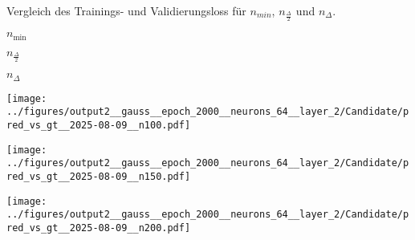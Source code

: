\begin{otherlanguage}{ngerman}
\begin{samepage}
\begin{minipage}{\textwidth}
\caption{Vergleich des Trainings- und Validierungsloss für $n_{min}$, $n_{\frac{\Delta}{2}}$ und $n_{\Delta}$.}
\label{fig:matrix_plot}

\begin{minipage}{0.05\textwidth}\vspace{0.5cm}\end{minipage}%
\begin{minipage}{0.3\textwidth}\centering \textbf{$n_{\mathrm{min}}$}\end{minipage}%
\begin{minipage}{0.3\textwidth}\centering \textbf{$n_{\frac{\Delta}{2}}$}\end{minipage}%
\begin{minipage}{0.3\textwidth}\centering \textbf{$n_{\Delta}$}\end{minipage}

\vspace{0.125cm}

\begin{minipage}{0.05\textwidth}
    \centering{}
\end{minipage}%
\begin{minipage}{0.3\textwidth}
    \centering
    \texttt{[image: ../figures/output2\_\_gauss\_\_epoch\_2000\_\_neurons\_64\_\_layer\_2/Candidate/pred\_vs\_gt\_\_2025-08-09\_\_n100.pdf]}
\end{minipage}%
\begin{minipage}{0.3\textwidth}
    \centering
    \texttt{[image: ../figures/output2\_\_gauss\_\_epoch\_2000\_\_neurons\_64\_\_layer\_2/Candidate/pred\_vs\_gt\_\_2025-08-09\_\_n150.pdf]}
\end{minipage}%
\begin{minipage}{0.3\textwidth}
    \centering
    \texttt{[image: ../figures/output2\_\_gauss\_\_epoch\_2000\_\_neurons\_64\_\_layer\_2/Candidate/pred\_vs\_gt\_\_2025-08-09\_\_n200.pdf]}
\end{minipage}

\label{fig:pred_vs_gt_matrix}

\end{minipage}
\end{samepage}

\clearpage


\end{otherlanguage}
